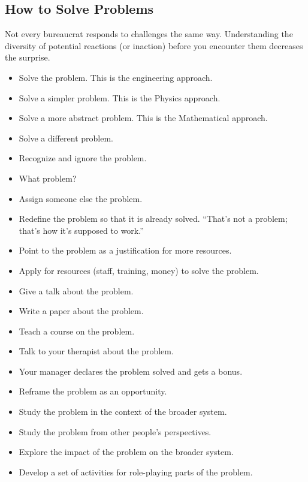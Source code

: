 \subsection*{How to Solve Problems}


Not every bureaucrat responds to challenges the same way. Understanding the diversity of potential reactions (or inaction) before you encounter them decreases the surprise. 

\begin{itemize}
    \item Solve the problem. This is the engineering approach.
    \item Solve a simpler problem. This is the Physics approach.
    \item Solve a more abstract problem. This is the Mathematical approach.
    \item Solve a different problem.
    \item Recognize and ignore the problem. 
    \item What problem?
    \item Assign someone else the problem.
    \item Redefine the problem so that it is already solved. ``That's not a problem; that's how it's supposed to work.''
    \item Point to the problem as a justification for more resources.
    \item Apply for resources (staff, training, money) to solve the problem.
    \item Give a talk about the problem.
    \item Write a paper about the problem.
    \item Teach a course on the problem.
    \item Talk to your therapist about the problem.
    \item Your manager declares the problem solved and gets a bonus.
    \item Reframe the problem as an opportunity. 
    \item Study the problem in the context of the broader system.
    \item Study the problem from other people's perspectives.
    \item Explore the impact of the problem on the broader system.
    \item Develop a set of activities for role-playing parts of the problem. 

\end{itemize}
